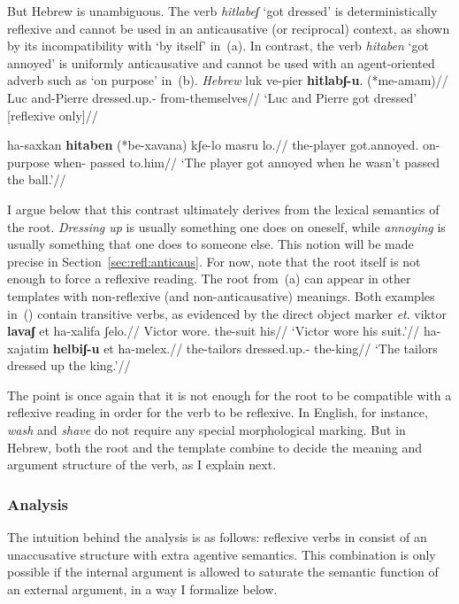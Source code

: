 But Hebrew {\thit} is unambiguous. The verb \emph{hitlabeʃ} `got dressed' is deterministically reflexive and cannot be used in an anticausative (or reciprocal) context, as shown by its incompatibility with `by itself' in~(\nextx a). In contrast, the verb \emph{hita\texttslig ben} `got annoyed' is uniformly anticausative and cannot be used with an agent-oriented adverb such as `on purpose' \citep{alexiadouanagnostopoulou04} in~(\nextx b).
\pex \textit{Hebrew}
	\a \begingl
	\gla luk ve-pier \textbf{hitlabʃ-u}. (*me-a{\texttslig}mam)//
	\glb Luc and-Pierre dressed.up.- \phantom{(*}from-themselves//
	\glft `Luc and Pierre got dressed' \hfill [reflexive only]//
	\endgl

	\a \begingl
	\gla ha-saxkan \textbf{hita\texttslig ben} (*be-xavana) kʃe-lo masru lo.//
	\glb the-player got.annoyed. \phantom{(*}on-purpose when- passed to.him//
	\glft `The player got annoyed when he wasn't passed the ball.'//
	\endgl
\xe

I argue below that this contrast ultimately derives from the lexical semantics of the root. \emph{Dressing up} is usually something one does on oneself, while \emph{annoying} is usually something that one does to someone else. This notion will be made precise in Section~\ref{sec:refl:anticaus}. For now, note that the root itself is not enough to force a reflexive reading. The root  from~(\lastx a) can appear in other templates with non-reflexive (and non-anticausative) meanings. Both examples in~(\nextx) contain transitive verbs, as evidenced by the direct object marker \emph{et}.
\pex
	\a \begingl
		\gla viktor \textbf{lavaʃ} et ha-xalifa ʃelo.//
		\glb Victor wore.  the-suit his//
		\glft `Victor wore his suit.'//
		\endgl
	\a \begingl
		\gla ha-xajatim \textbf{helbiʃ-u} et ha-melex.//
		\glb the-tailors dressed.up.-  the-king//
		\glft `The tailors dressed up the king.'//
		\endgl
\xe

The point is once again that it is not enough for the root to be compatible with a reflexive reading in order for the verb to be reflexive. In English, for instance, \emph{wash} and \emph{shave} do not require any special morphological marking. But in Hebrew, both the root and the template combine to decide the meaning and argument structure of the verb, as I explain next.


	\subsubsection{Analysis}
The intuition behind the analysis is as follows: reflexive verbs in {\thit} consist of an unaccusative structure with extra agentive semantics. This combination is only possible if the internal argument is allowed to saturate the semantic function of an external argument, in a way I formalize below.

